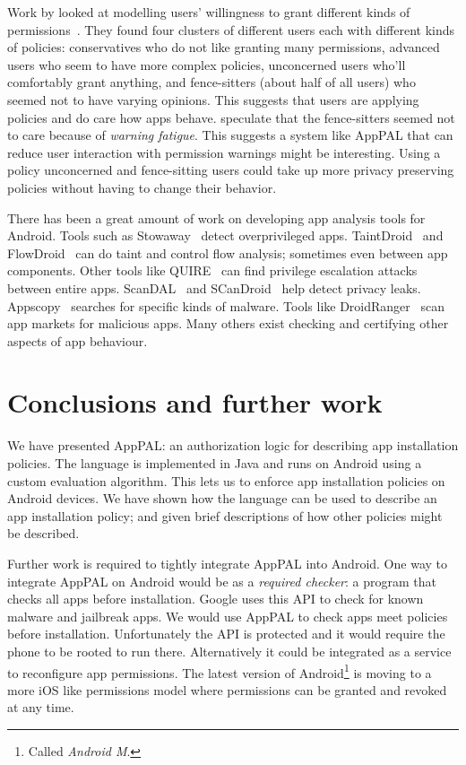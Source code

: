 \documentclass[]{scrartcl}
\newcommand{\comment}[1]{}%
\begin{document}
Work by \citeauthor{Sadeh:2014vq} looked at modelling users' willingness to grant different kinds of permissions~\citep{Sadeh:2014vq}.
They found four clusters of different users each with different kinds of policies:
  conservatives who do not like granting many permissions,
  advanced users who seem to have more complex policies,
  unconcerned users who'll comfortably grant anything,
  and fence-sitters (about half of all users) who seemed not to have varying opinions.
This suggests that users are applying policies and do care how apps behave.
\citeauthor{Sadeh:2014vq} speculate that the fence-sitters seemed not to care because of \emph{warning fatigue}.
This suggests a system like AppPAL that can reduce user interaction with permission warnings might be interesting.
Using a policy unconcerned and fence-sitting users could take up more privacy preserving policies without having to change their behavior.

There has been a great amount of work on developing app analysis tools for Android.
Tools such as Stowaway~\citep{Felt:2011kj} detect overprivileged apps.
TaintDroid~\citep{Enck:2010uw} and FlowDroid~\citep{Fritz:2013vi} can do taint and control flow analysis; sometimes even between app components.
Other tools like QUIRE~\citep{Bugiel:2012ui} can find privilege escalation attacks between entire apps.
ScanDAL~\citep{Kim:2012vt} and SCanDroid~\citep{Fuchs:2009vi} help detect privacy leaks.
Appscopy~\citep{Feng:kPGZr_ja} searches for specific kinds of malware.
Tools like DroidRanger~\citep{Zhou:2012tb} scan app markets for malicious apps.
Many others exist checking and certifying other aspects of app behaviour.

\section{Conclusions and further work \comment{$\frac{1}{2}$ page}}

We have presented AppPAL: an authorization logic for describing app installation policies.
The language is implemented in Java and runs on Android using a custom evaluation algorithm.
This lets us to enforce app installation policies on Android devices.
We have shown how the language can be used to describe an app installation policy;
  and given brief descriptions of how other policies might be described.

Further work is required to tightly integrate AppPAL into Android.
One way to integrate AppPAL on Android would be as a \emph{required checker}: a program that checks all apps before installation.
Google uses this API to check for known malware and jailbreak apps.
We would use AppPAL to check apps meet policies before installation.
Unfortunately the API is protected and it would require the phone to be rooted to run there.
Alternatively it could be integrated as a service to reconfigure app permissions.
The latest version of Android\footnote{Called \emph{Android M}.} is moving to a more iOS like permissions model where permissions can be granted and revoked at any time.
\end{document}
